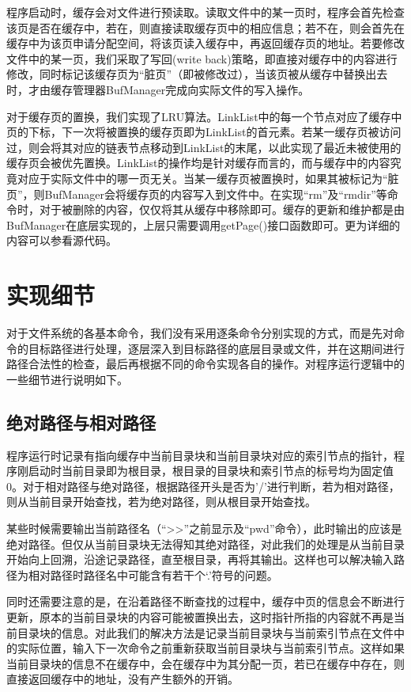 程序启动时，缓存会对文件进行预读取。读取文件中的某一页时，程序会首先检查该页是否在缓存中，若在，则直接读取缓存页中的相应信息；若不在，则会首先在缓存中为该页申请分配空间，将该页读入缓存中，再返回缓存页的地址。若要修改文件中的某一页，我们采取了写回(write back)策略，即直接对缓存中的内容进行修改，同时标记该缓存页为“脏页”（即被修改过），当该页被从缓存中替换出去时，才由缓存管理器BufManager完成向实际文件的写入操作。

对于缓存页的置换，我们实现了LRU算法。LinkList中的每一个节点对应了缓存中页的下标，下一次将被置换的缓存页即为LinkList的首元素。若某一缓存页被访问过，则会将其对应的链表节点移动到LinkList的末尾，以此实现了最近未被使用的缓存页会被优先置换。LinkList的操作均是针对缓存而言的，而与缓存中的内容究竟对应于实际文件中的哪一页无关。当某一缓存页被置换时，如果其被标记为“脏页”，则BufManager会将缓存页的内容写入到文件中。在实现“rm”及“rmdir”等命令时，对于被删除的内容，仅仅将其从缓存中移除即可。缓存的更新和维护都是由BufManager在底层实现的，上层只需要调用getPage()接口函数即可。更为详细的内容可以参看源代码。

\section{实现细节}
对于文件系统的各基本命令，我们没有采用逐条命令分别实现的方式，而是先对命令的目标路径进行处理，逐层深入到目标路径的底层目录或文件，并在这期间进行路径合法性的检查，最后再根据不同的命令实现各自的操作。对程序运行逻辑中的一些细节进行说明如下。

\subsection{绝对路径与相对路径}
程序运行时记录有指向缓存中当前目录块和当前目录块对应的索引节点的指针，程序刚启动时当前目录即为根目录，根目录的目录块和索引节点的标号均为固定值0。对于相对路径与绝对路径，根据路径开头是否为'/'进行判断，若为相对路径，则从当前目录开始查找，若为绝对路径，则从根目录开始查找。

某些时候需要输出当前路径名（“>>”之前显示及“pwd”命令），此时输出的应该是绝对路径。但仅从当前目录块无法得知其绝对路径，对此我们的处理是从当前目录开始向上回溯，沿途记录路径，直至根目录，再将其输出。这样也可以解决输入路径为相对路径时路径名中可能含有若干个‘.’符号的问题。

同时还需要注意的是，在沿着路径不断查找的过程中，缓存中页的信息会不断进行更新，原本的当前目录块的内容可能被置换出去，这时指针所指的内容就不再是当前目录块的信息。对此我们的解决方法是记录当前目录块与当前索引节点在文件中的实际位置，输入下一次命令之前重新获取当前目录块与当前索引节点。这样如果当前目录块的信息不在缓存中，会在缓存中为其分配一页，若已在缓存中存在，则直接返回缓存中的地址，没有产生额外的开销。

